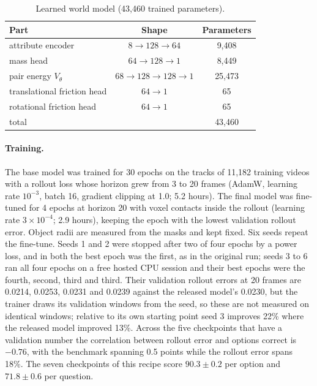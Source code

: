 \documentclass[10pt,onecolumn,letterpaper]{article}
\begin{document}
\begin{table}[h]
\caption{Learned world model (43,460 trained parameters).}
\label{tab:params}
\centering
\small
\begin{tabular}{@{}lcc@{}}
\toprule
Part & Shape & Parameters \\
\midrule
attribute encoder & $8 \to 128 \to 64$ & 9,408 \\
mass head & $64 \to 128 \to 1$ & 8,449 \\
pair energy $V_\theta$ & $68 \to 128 \to 128 \to 1$ & 25,473 \\
translational friction head & $64 \to 1$ & 65 \\
rotational friction head & $64 \to 1$ & 65 \\
\midrule
total & & 43,460 \\
\bottomrule
\end{tabular}
\end{table}

\paragraph{Training.}
The base model was trained for 30 epochs on the tracks of 11,182 training videos with a rollout loss whose horizon grew from 3 to 20 frames (AdamW, learning rate $10^{-3}$, batch 16, gradient clipping at 1.0; 5.2 hours).
The final model was fine-tuned for 4 epochs at horizon 20 with voxel contacts inside the rollout (learning rate $3 \times 10^{-4}$; 2.9 hours), keeping the epoch with the lowest validation rollout error.
Object radii are measured from the masks and kept fixed.
Six seeds repeat the fine-tune. Seeds 1 and 2 were stopped after two of four epochs by a power loss, and in both the best epoch was the first, as in the original run; seeds 3 to 6 ran all four epochs on a free hosted CPU session and their best epochs were the fourth, second, third and third.
Their validation rollout errors at 20 frames are 0.0214, 0.0253, 0.0231 and 0.0239 against the released model's 0.0230, but the trainer draws its validation windows from the seed, so these are not measured on identical windows; relative to its own starting point seed 3 improves 22\% where the released model improved 13\%.
Across the five checkpoints that have a validation number the correlation between rollout error and options correct is $-0.76$, with the benchmark spanning 0.5 points while the rollout error spans 18\%.
The seven checkpoints of this recipe score $90.3 \pm 0.2$ per option and $71.8 \pm 0.6$ per question.
\end{document}
